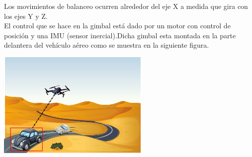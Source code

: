 Los movimientos de balanceo ocurren alrededor del eje X a medida que gira con los ejes Y y Z.\\
El control que se hace en la gimbal está dado por un motor con control de posición y una IMU (sensor inercial).Dicha gimbal esta
montada en la parte delantera del vehículo aéreo como se muestra en la siguiente figura.
\begin{center}
	\includegraphics[width=0.55\textwidth]{Contenido/Cuerpo/Capitulo3/Fig2.eps}
	\label{fig:ModeloMat:Fig1}
\end{center}
